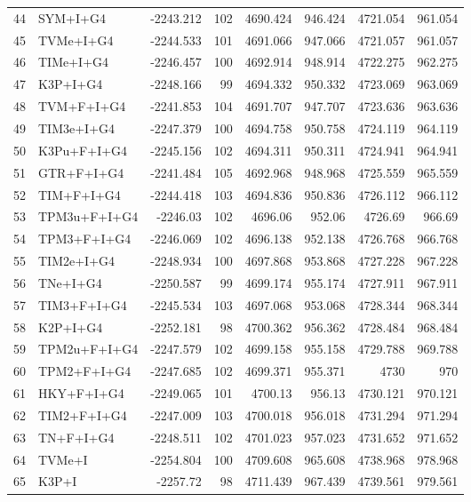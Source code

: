 \documentclass[12pt]{article}
\begin{document}
\begin{longtable}{clrrrrrr}
	44 & SYM+I+G4 & -2243.212 & 102 & 4690.424 & 946.424 & 4721.054 & 961.054 \\ 
	45 & TVMe+I+G4 & -2244.533 & 101 & 4691.066 & 947.066 & 4721.057 & 961.057 \\ 
	46 & TIMe+I+G4 & -2246.457 & 100 & 4692.914 & 948.914 & 4722.275 & 962.275 \\ 
	47 & K3P+I+G4 & -2248.166 & 99 & 4694.332 & 950.332 & 4723.069 & 963.069 \\ 
	48 & TVM+F+I+G4 & -2241.853 & 104 & 4691.707 & 947.707 & 4723.636 & 963.636 \\ 
	49 & TIM3e+I+G4 & -2247.379 & 100 & 4694.758 & 950.758 & 4724.119 & 964.119 \\ 
	50 & K3Pu+F+I+G4 & -2245.156 & 102 & 4694.311 & 950.311 & 4724.941 & 964.941 \\ 
	51 & GTR+F+I+G4 & -2241.484 & 105 & 4692.968 & 948.968 & 4725.559 & 965.559 \\ 
	52 & TIM+F+I+G4 & -2244.418 & 103 & 4694.836 & 950.836 & 4726.112 & 966.112 \\ 
	53 & TPM3u+F+I+G4 & -2246.03 & 102 & 4696.06 & 952.06 & 4726.69 & 966.69 \\ 
	54 & TPM3+F+I+G4 & -2246.069 & 102 & 4696.138 & 952.138 & 4726.768 & 966.768 \\ 
	55 & TIM2e+I+G4 & -2248.934 & 100 & 4697.868 & 953.868 & 4727.228 & 967.228 \\ 
	56 & TNe+I+G4 & -2250.587 & 99 & 4699.174 & 955.174 & 4727.911 & 967.911 \\ 
	57 & TIM3+F+I+G4 & -2245.534 & 103 & 4697.068 & 953.068 & 4728.344 & 968.344 \\ 
	58 & K2P+I+G4 & -2252.181 & 98 & 4700.362 & 956.362 & 4728.484 & 968.484 \\ 
	59 & TPM2u+F+I+G4 & -2247.579 & 102 & 4699.158 & 955.158 & 4729.788 & 969.788 \\ 
	60 & TPM2+F+I+G4 & -2247.685 & 102 & 4699.371 & 955.371 & 4730 & 970 \\ 
	61 & HKY+F+I+G4 & -2249.065 & 101 & 4700.13 & 956.13 & 4730.121 & 970.121 \\ 
	62 & TIM2+F+I+G4 & -2247.009 & 103 & 4700.018 & 956.018 & 4731.294 & 971.294 \\ 
	63 & TN+F+I+G4 & -2248.511 & 102 & 4701.023 & 957.023 & 4731.652 & 971.652 \\ 
	64 & TVMe+I & -2254.804 & 100 & 4709.608 & 965.608 & 4738.968 & 978.968 \\ 
	65 & K3P+I & -2257.72 & 98 & 4711.439 & 967.439 & 4739.561 & 979.561 \\ 

\end{longtable}
\end{document}
